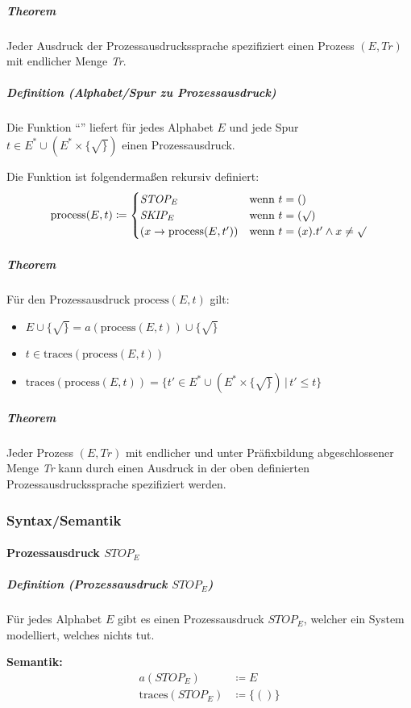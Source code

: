 \documentclass[a4paper, 11pt, accentcolor = tud3b]{tudreport}
\newcommand{\forwhich}{\ensuremath{{\,\vert\,}}}
\newcommand{\subsubparagraph}[1]{\hspace{1cm} \textbf{#1:}}
\newcommand{\definition}[2]{\subparagraph{Definition (#1)} #2}
\newcommand{\theorem}[1]{\subparagraph{Theorem} #1}
\begin{document}
				    \theorem{
				    	Jeder Ausdruck der Prozessausdruckssprache spezifiziert einen Prozess $ (E, \textit{Tr}) $ mit endlicher Menge \textit{Tr}.
				    }
				    
				    \definition{Alphabet/Spur zu Prozessausdruck}{
				    	Die Funktion \enquote{\text{process}} liefert für jedes Alphabet $ E $ und jede Spur $ t \in E ^ * \cup (E ^ * \times \{ \surd \}) $ einen Prozessausdruck.
				    	
				    	Die Funktion ist folgendermaßen rekursiv definiert:
				    	\begin{equation*}
					    	\text{process}(E, t) \coloneqq \begin{cases}
						    	\textit{STOP} _ E & \text{wenn } t = () \\
						    	\textit{SKIP} _ E & \text{wenn } t = (\surd) \\
						    	(x \rightarrow \text{process}(E, t')) & \text{wenn } t = (x).t' \land x \neq \surd
					    	\end{cases}
				    	\end{equation*}
				    }
				    
				    \theorem{
				    	Für den Prozessausdruck $ \text{process}(E, t) $ gilt:
				    	\begin{itemize}
				    		\item $ E \cup \{ \surd \} = a(\text{process}(E, t)) \cup \{ \surd \} $
				    		\item $ t \in \text{traces}(\text{process}(E, t)) $
				    		\item $ \text{traces}(\text{process}(E, t)) = \{ t' \in E ^ * \cup (E ^ * \times \{ \surd \}) \forwhich t' \leq t \} $
				    	\end{itemize}
				    }
				    
				    \theorem{Jeder Prozess $ (E, \textit{Tr}) $ mit endlicher und unter Präfixbildung abgeschlossener Menge \textit{Tr} kann durch einen Ausdruck in der oben definierten Prozessausdruckssprache spezifiziert werden.}
			    
			    \subsubsection{Syntax/Semantik}
				    \paragraph{Prozessausdruck $ \textit{STOP} _ E $}
					    \definition{Prozessausdruck $ \textit{STOP} _ E $}{
					    	Für jedes Alphabet $ E $ gibt es einen Prozessausdruck $ \textit{STOP} _ E $, welcher ein System modelliert, welches nichts tut.
					    	
					    	\subsubparagraph{Semantik}
						    	\begin{align*}
							    	a(\textit{STOP} _ E) &\coloneqq E \\
							    	\text{traces}(\textit{STOP} _ E) &\coloneqq \{ () \} \\
						    	\end{align*}
					    }
				    
\end{document}
